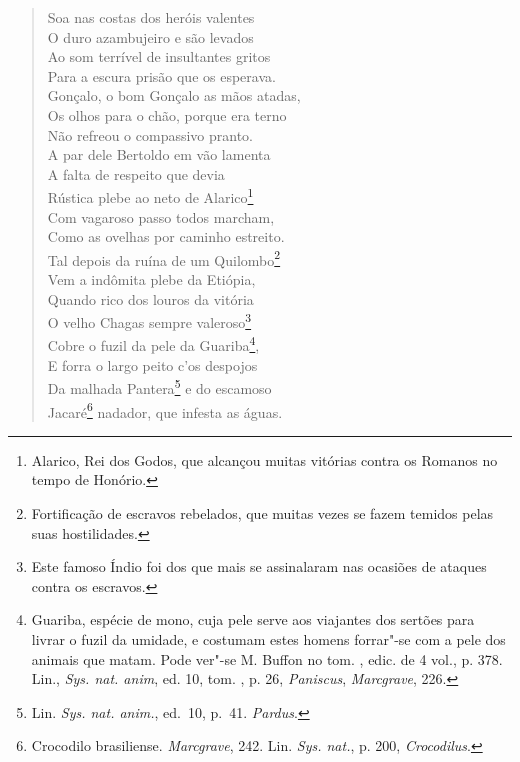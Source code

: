 \begin{verse}
Soa nas costas dos heróis valentes\\
O duro azambujeiro e são levados\\
Ao som terrível de insultantes gritos\\
Para a escura prisão que os esperava.\\
Gonçalo, o bom Gonçalo as mãos atadas,\\
Os olhos para o chão, porque era terno\\
Não refreou o compassivo pranto.\\
A par dele Bertoldo em vão lamenta\\
A falta de respeito que devia\\
Rústica plebe ao neto de Alarico\footnote{ Alarico, Rei dos Godos, que
alcançou muitas vitórias contra os Romanos no tempo de Honório.}\\
Com vagaroso passo todos marcham,\\
Como as ovelhas por caminho estreito.\\
Tal depois da ruína de um Quilombo\footnote{ Fortificação de escravos
rebelados, que muitas vezes se fazem temidos pelas suas hostilidades.}\\
Vem a indômita plebe da Etiópia,\\
Quando rico dos louros da vitória\\			\index{\Lour}
O velho Chagas sempre valeroso\footnote{ Este famoso Índio foi dos que
mais se assinalaram nas ocasiões de ataques contra os escravos.}\\
Cobre o fuzil da pele da Guariba\footnote{ Guariba, espécie de mono, 
cuja pele serve aos viajantes dos sertões para livrar o fuzil da umidade, e
costumam estes homens forrar"-se com a pele dos animais que matam. Pode ver"-se
M. Buffon no tom. , edic. de 4 vol., p. 378. Lin., \textit{Sys. nat. anim},
ed. 10, tom. , p. 26, \textit{Paniscus}, \textit{Marcgrave}, 226.},\\		\index{\Marc}
E forra o largo peito c'os despojos\\
Da malhada Pantera\footnote{ Lin. \textit{Sys. nat. anim.}, ed.~10, p.~41. \textit{Pardus}.} e do escamoso\\
Jacaré\footnote{ Crocodilo brasiliense. \textit{Marcgrave}, 242. Lin.		
\textit{Sys. nat.}, p. 200,  \textit{Crocodilus}.} nadador, que infesta as
águas. \\[10pt] 	\index{\Marc}  %

\end{verse}

